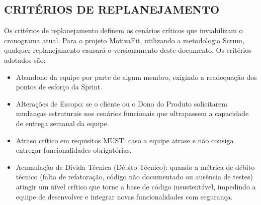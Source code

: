 \subsection{CRITÉRIOS DE REPLANEJAMENTO}

Os critérios de replanejamento definem os cenários críticos que inviabilizam o cronograma atual. Para o projeto MotivaFit, utilizando a metodologia Scrum, qualquer replanejamento causará o versionamento deste documento. Os critérios adotados são:

\begin{itemize}
\item Abandono da equipe por parte de algum membro, exigindo a readequação dos pontos de esforço da Sprint.
\item Alterações de Escopo: se o cliente ou o Dono do Produto solicitarem mudanças estruturais nos cenários funcionais que ultrapassem a capacidade de entrega semanal da equipe.
\item Atraso crítico em requisitos MUST: caso a equipe atrase e não consiga entregar funcionalidades obrigatórias.
\item Acumulação de Dívida Técnica (Débito Técnico): quando a métrica de débito técnico (falta de refatoração, código não documentado ou ausência de testes) atingir um nível crítico que torne a base de código insustentável, impedindo a equipe de desenvolver e integrar novas funcionalidades com segurança.
\end{itemize}

